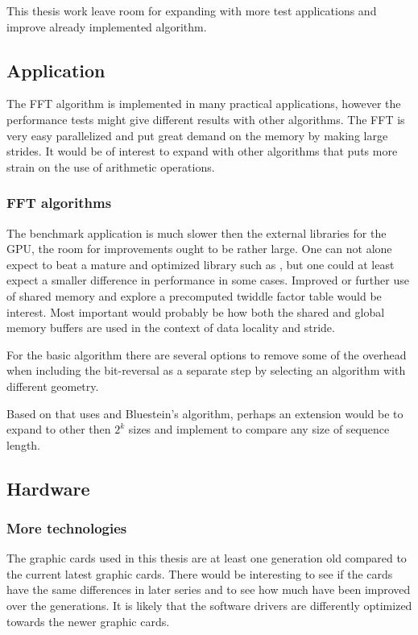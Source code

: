 This thesis work leave room for expanding with more test applications and improve already implemented algorithm.

\subsection{Application}

The \gls{FFT} algorithm is implemented in many practical applications, however the performance tests might give different results with other algorithms. The \gls{FFT} is very easy parallelized and put great demand on the memory by making large strides. It would be of interest to expand with other algorithms that puts more strain on the use of arithmetic operations.

\subsubsection{FFT algorithms}

The benchmark application is much slower then the external libraries for the \gls{GPU}, the room for improvements ought to be rather large. One can not alone expect to beat a mature and optimized library such as {\CUFFT}, but one could at least expect a smaller difference in performance in some cases. Improved or further use of shared memory and explore a precomputed twiddle factor table would be interest. Most important would probably be how both the shared and global memory buffers are used in the context of data locality and stride.

For the basic algorithm there are several options to remove some of the overhead when including the bit-reversal as a separate step by selecting an algorithm with different geometry.

Based on {\CUFFT} that uses {\CTALG} and Bluestein's algorithm, perhaps an extension would be to expand to other then $2^{k}$ sizes and implement to compare any size of sequence length.

\subsection{Hardware}

\subsubsection{More technologies}

The graphic cards used in this thesis are at least one generation old compared to the current latest graphic cards. There would be interesting to see if the cards have the same differences in later series and to see how much have been improved over the generations. It is likely that the software drivers are differently optimized towards the newer graphic cards.

